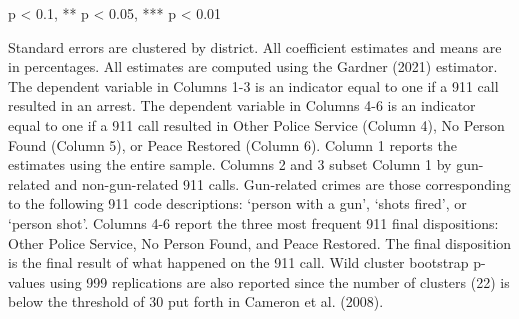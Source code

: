\begin{table}[H]
\begin{threeparttable}
\begin{tablenotes}
\item * p < 0.1, ** p < 0.05, *** p < 0.01
\item Standard errors are clustered by district. All                      coefficient estimates and means are in percentages. All estimates                      are computed using the Gardner (2021) estimator.                       The dependent variable in Columns 1-3 is an indicator equal to one if a 911 call resulted in an arrest.                      The dependent variable in Columns 4-6 is an indicator equal to one if a 911 call resulted in                       Other Police Service (Column 4), No Person Found (Column 5), or Peace Restored (Column 6).                      Column 1 reports the estimates using the entire sample.                  Columns 2 and 3 subset Column 1 by gun-related and non-gun-related 911 calls.                  Gun-related crimes are those corresponding to the following                  911 code descriptions: `person with a gun',                  `shots fired', or `person shot'.                   Columns 4-6 report the three most frequent 911 final dispositions: Other Police Service, No Person Found,                   and Peace Restored. The final disposition is the final result of                  what happened on the 911 call.                   Wild cluster bootstrap p-values using 999 replications are also reported                  since the number of clusters (22) is below the threshold of 30 put forth in                  Cameron et al. (2008).                  
\end{tablenotes}
\end{threeparttable}
\end{table}
